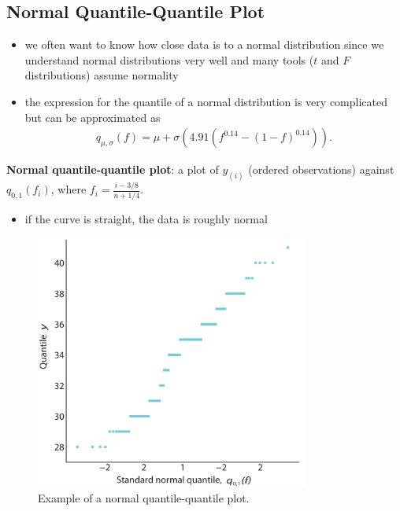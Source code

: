 \documentclass[10pt]{article}
\begin{document}
\subsection{Normal Quantile-Quantile Plot}
\begin{itemize}
    \item we often want to know how close data is to a normal distribution since we understand normal distributions very well and many tools ($t$ and $F$ distributions) assume normality
    \item the expression for the quantile of a normal distribution is very complicated but can be approximated as 
        \begin{gather*}
            q_{\mu,\sigma}(f) = \mu + \sigma(4.91(f^{0.14} - (1-f)^{0.14}))
        .\end{gather*}
\end{itemize}
\begin{definition}
    \textbf{Normal quantile-quantile plot}: a plot of $y_{(i)}$ (ordered observations) against $q_{0,1}(f_i)$, where $f_i = \frac{i-3 / 8}{n + 1 / 4}$.
\end{definition}
\begin{itemize}
    \item if the curve is straight, the data is roughly normal
\end{itemize}
\begin{figure}[h]
    \centering
    \includegraphics[width=0.8\textwidth]{normalQQPlot}
    \caption{Example of a normal quantile-quantile plot.}
    \label{fig:normalQQPlot}
\end{figure}
\end{document}
